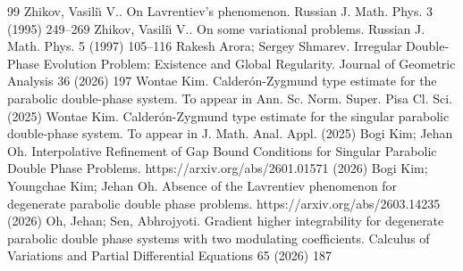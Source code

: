 \documentclass[10pt,a4paper]{amsart}
\numberwithin{equation}{section}
\begin{document}
\begin{thebibliography}{99}
 Zhikov, Vasili\u{\i} V.. On {L}avrentiev's phenomenon. Russian J. Math. Phys. 3 (1995) 249--269
 Zhikov, Vasili\u{\i} V.. On some variational problems. Russian J. Math. Phys. 5 (1997) 105--116
 Rakesh Arora; Sergey Shmarev. Irregular Double-Phase Evolution Problem: Existence and Global Regularity. Journal of Geometric Analysis 36 (2026) 197
 Wontae Kim. Calder\'on-Zygmund type estimate for the parabolic double-phase system. To appear in Ann. Sc. Norm. Super. Pisa Cl. Sci. (2025)
 Wontae Kim. Calder\'on-Zygmund type estimate for the singular parabolic double-phase system. To appear in J. Math. Anal. Appl. (2025)
 Bogi Kim; Jehan Oh. Interpolative Refinement of Gap Bound Conditions for Singular Parabolic Double Phase Problems. https://arxiv.org/abs/2601.01571 (2026)
 Bogi Kim; Youngchae Kim; Jehan Oh. Absence of the Lavrentiev phenomenon for degenerate parabolic double phase problems. https://arxiv.org/abs/2603.14235 (2026)
 Oh, Jehan; Sen, Abhrojyoti. Gradient higher integrability for degenerate parabolic double phase systems with two modulating coefficients. Calculus of Variations and Partial Differential Equations 65 (2026) 187
\end{thebibliography}
\end{document}
